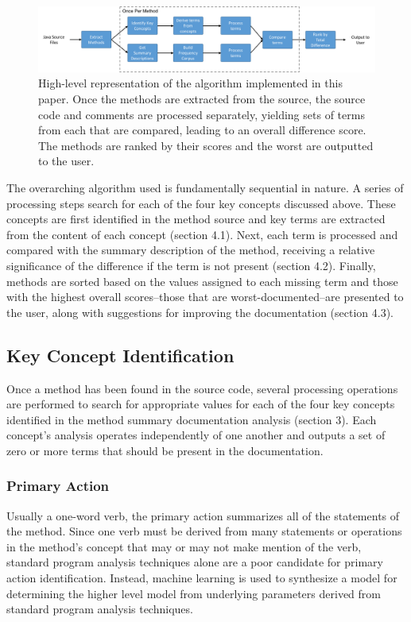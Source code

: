 \documentclass[preprint]{sigplanconf}
\begin{document}
\begin{figure}
	\begin{center}
		\includegraphics[width=\linewidth]{algorithm-structure.png}
	\end{center}
	\caption{High-level representation of the algorithm implemented in this paper. Once the methods are extracted from the source, the source code and comments are processed separately, yielding sets of terms from each that are compared, leading to an overall difference score. The methods are ranked by their scores and the worst are outputted to the user.}
	\label{figure-algorithm-summary}
\end{figure}

The overarching algorithm used is fundamentally sequential in nature. A series of processing steps search for each of the four key concepts discussed above. These concepts are first identified in the method source and key terms are extracted from the content of each concept (section 4.1). Next, each term is processed and compared with the summary description of the method, receiving a relative significance of the difference if the term is not present (section 4.2). Finally, methods are sorted based on the values assigned to each missing term and those with the highest overall scores--those that are worst-documented--are presented to the user, along with suggestions for improving the documentation (section 4.3).

\subsection{Key Concept Identification}
Once a method has been found in the source code, several processing operations are performed to search for appropriate values for each of the four key concepts identified in the method summary documentation analysis (section 3). Each concept's analysis operates independently of one another and outputs a set of zero or more terms that should be present in the documentation.

\subsubsection{Primary Action}
Usually a one-word verb, the primary action summarizes all of the statements of the method. Since one verb must be derived from many statements or operations in the method's concept that may or may not make mention of the verb, standard program analysis techniques alone are a poor candidate for primary action identification. Instead, machine learning is used to synthesize a model for determining the higher level model from underlying parameters derived from standard program analysis techniques.
\end{document}
